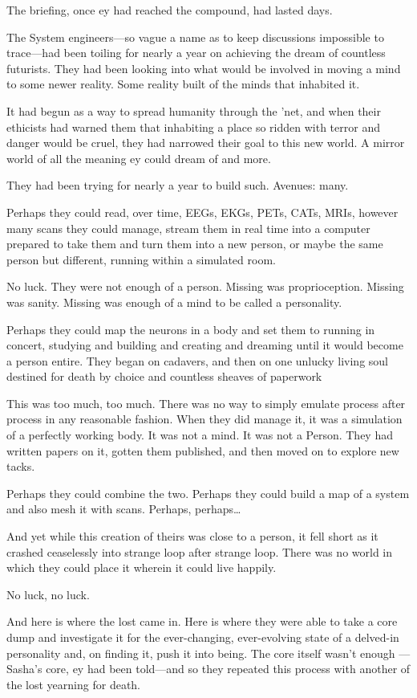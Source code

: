 The briefing, once ey had reached the compound, had lasted days.

The System engineers—so vague a name as to keep discussions impossible to trace—had been toiling for nearly a year on achieving the dream of countless futurists. They had been looking into what would be involved in moving a mind to some newer reality. Some reality built of the minds that inhabited it.

It had begun as a way to spread humanity through the 'net, and when their ethicists had warned them that inhabiting a place so ridden with terror and danger would be cruel, they had narrowed their goal to this new world. A mirror world of all the meaning ey could dream of and more.

They had been trying for nearly a year to build such. Avenues: many.

Perhaps they could read, over time, EEGs, EKGs, PETs, CATs, MRIs, however many scans they could manage, stream them in real time into a computer prepared to take them and turn them into a new person, or maybe the same person but different, running within a simulated room.

No luck. They were not enough of a person. Missing was proprioception. Missing was sanity. Missing was enough of a mind to be called a personality.

Perhaps they could map the neurons in a body and set them to running in concert, studying and building and creating and dreaming until it would become a person entire. They began on cadavers, and then on one unlucky living soul destined for death by choice and countless sheaves of paperwork

This was too much, too much. There was no way to simply emulate process after process in any reasonable fashion. When they did manage it, it was a simulation of a perfectly working body. It was not a mind. It was not a Person. They had written papers on it, gotten them published, and then moved on to explore new tacks.

Perhaps they could combine the two. Perhaps they could build a map of a system and also mesh it with scans. Perhaps, perhaps\ldots{}

And yet while this creation of theirs was close to a person, it fell short as it crashed ceaselessly into strange loop after strange loop. There was no world in which they could place it wherein it could live happily.

No luck, no luck.

And here is where the lost came in. Here is where they were able to take a core dump and investigate it for the ever-changing, ever-evolving state of a delved-in personality and, on finding it, push it into being. The core itself wasn't enough — Sasha's core, ey had been told—and so they repeated this process with another of the lost yearning for death.

